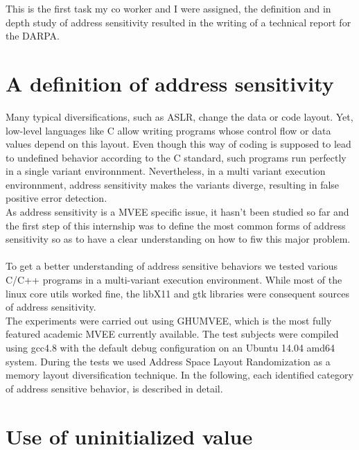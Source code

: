 \documentclass[english]{enstaPRE}
\begin{document}
This is the first task my co worker and I were assigned, the definition and in depth study of address sensitivity resulted in the
writing of a technical report for the DARPA. 

\section{A definition of address sensitivity}

Many typical diversifications, such as ASLR, change the data or code layout. Yet, low-level languages like C allow writing programs whose
control flow or data values depend on this layout. Even though this way of coding is supposed to lead to undefined behavior according to the C standard, 
such programs run perfectly in a single variant environnment. Nevertheless, in a multi variant execution environnment, address sensitivity makes the variants
diverge, resulting in false positive error detection. \\
As address sensitivity is a MVEE specific issue, it hasn't been studied so far and the first step of this internship was to define the most common forms of address
sensitivity so as to have a clear understanding on how to fiw this major problem. \\ \\
To get a better understanding of address sensitive behaviors we tested various C/C++
programs in a multi-variant execution environment. While most of the linux core utils
worked fine, the libX11 and gtk libraries were consequent sources of address sensitivity.\\
The experiments were carried out using GHUMVEE\cite{volckaert2015cloning}, which is the most fully featured academic MVEE currently available.
The test subjects were compiled using gcc4.8
with the default debug configuration on an Ubuntu 14.04 amd64 system. During the tests we used Address Space Layout Randomization as a memory 
layout diversification technique.
In the following, each identified category of address sensitive behavior, is described in detail.


\section{Use of uninitialized value} \label{uninit}
\end{document}
